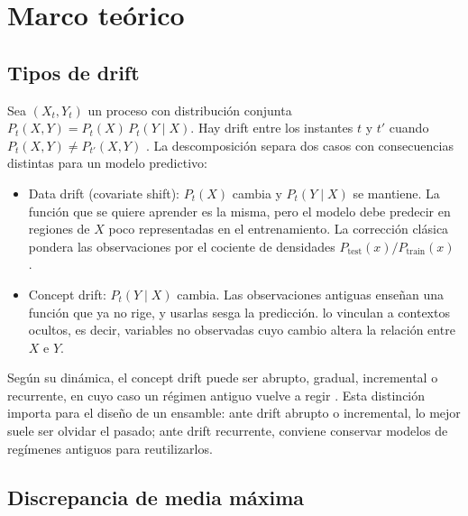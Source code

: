 \documentclass[11pt,a4paper]{article}
\begin{document}
\section{Marco teórico}\label{sec:marco}

\subsection{Tipos de drift}

Sea $(X_t, Y_t)$ un proceso con distribución conjunta $P_t(X,Y) = P_t(X)\,P_t(Y\mid X)$. Hay drift
entre los instantes $t$ y $t'$ cuando $P_t(X,Y)\neq P_{t'}(X,Y)$
\parencite{gama2014,lu2019}. La descomposición separa dos casos con consecuencias distintas para un
modelo predictivo:

\begin{itemize}
  \item Data drift (covariate shift): $P_t(X)$ cambia y $P_t(Y\mid X)$ se mantiene. La función que
  se quiere aprender es la misma, pero el modelo debe predecir en regiones de $X$ poco representadas
  en el entrenamiento. La corrección clásica pondera las observaciones por el cociente de densidades
  $P_{\text{test}}(x)/P_{\text{train}}(x)$ \parencite{shimodaira2000}.
  \item Concept drift: $P_t(Y\mid X)$ cambia. Las observaciones antiguas enseñan una función que ya no
  rige, y usarlas sesga la predicción. \textcite{widmer1996} lo vinculan a contextos ocultos, es decir,
  variables no observadas cuyo cambio altera la relación entre $X$ e $Y$.
\end{itemize}

Según su dinámica, el concept drift puede ser abrupto, gradual, incremental o recurrente, en cuyo
caso un régimen antiguo vuelve a regir \parencite{gama2014}. Esta distinción importa para el diseño
de un ensamble: ante drift abrupto o incremental, lo mejor suele ser olvidar el pasado; ante drift
recurrente, conviene conservar modelos de regímenes antiguos para reutilizarlos.

\subsection{Discrepancia de media máxima}
\end{document}
